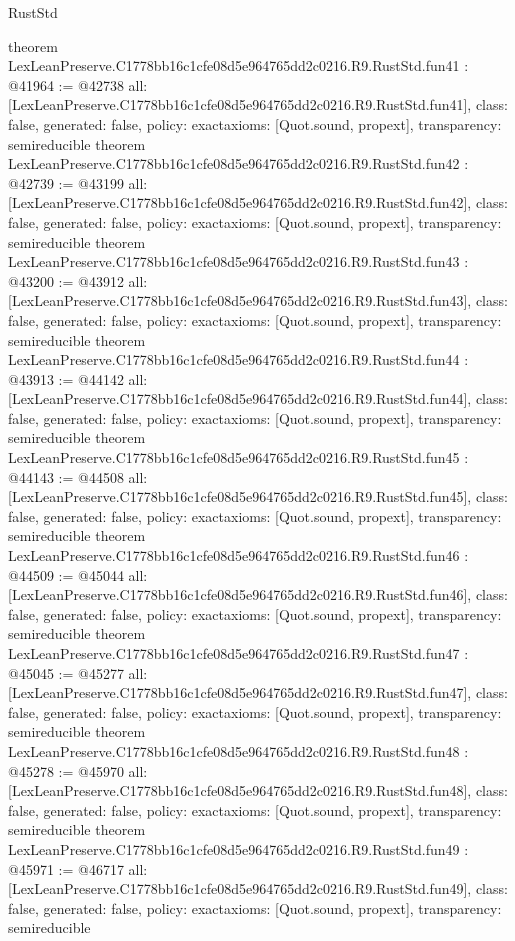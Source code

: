 \begin{lexlean}{RustStd}
\begin{coremodule}
{}
theorem LexLeanPreserve.C1778bb16c1cfe08d5e964765dd2c0216.R9.RustStd.fun41 : @41964 := @42738 {
  all: [LexLeanPreserve.C1778bb16c1cfe08d5e964765dd2c0216.R9.RustStd.fun41],
  class: false,
  generated: false,
  policy: exact{axioms: [Quot.sound, propext]},
  transparency: semireducible
}
theorem LexLeanPreserve.C1778bb16c1cfe08d5e964765dd2c0216.R9.RustStd.fun42 : @42739 := @43199 {
  all: [LexLeanPreserve.C1778bb16c1cfe08d5e964765dd2c0216.R9.RustStd.fun42],
  class: false,
  generated: false,
  policy: exact{axioms: [Quot.sound, propext]},
  transparency: semireducible
}
theorem LexLeanPreserve.C1778bb16c1cfe08d5e964765dd2c0216.R9.RustStd.fun43 : @43200 := @43912 {
  all: [LexLeanPreserve.C1778bb16c1cfe08d5e964765dd2c0216.R9.RustStd.fun43],
  class: false,
  generated: false,
  policy: exact{axioms: [Quot.sound, propext]},
  transparency: semireducible
}
theorem LexLeanPreserve.C1778bb16c1cfe08d5e964765dd2c0216.R9.RustStd.fun44 : @43913 := @44142 {
  all: [LexLeanPreserve.C1778bb16c1cfe08d5e964765dd2c0216.R9.RustStd.fun44],
  class: false,
  generated: false,
  policy: exact{axioms: [Quot.sound, propext]},
  transparency: semireducible
}
theorem LexLeanPreserve.C1778bb16c1cfe08d5e964765dd2c0216.R9.RustStd.fun45 : @44143 := @44508 {
  all: [LexLeanPreserve.C1778bb16c1cfe08d5e964765dd2c0216.R9.RustStd.fun45],
  class: false,
  generated: false,
  policy: exact{axioms: [Quot.sound, propext]},
  transparency: semireducible
}
theorem LexLeanPreserve.C1778bb16c1cfe08d5e964765dd2c0216.R9.RustStd.fun46 : @44509 := @45044 {
  all: [LexLeanPreserve.C1778bb16c1cfe08d5e964765dd2c0216.R9.RustStd.fun46],
  class: false,
  generated: false,
  policy: exact{axioms: [Quot.sound, propext]},
  transparency: semireducible
}
theorem LexLeanPreserve.C1778bb16c1cfe08d5e964765dd2c0216.R9.RustStd.fun47 : @45045 := @45277 {
  all: [LexLeanPreserve.C1778bb16c1cfe08d5e964765dd2c0216.R9.RustStd.fun47],
  class: false,
  generated: false,
  policy: exact{axioms: [Quot.sound, propext]},
  transparency: semireducible
}
theorem LexLeanPreserve.C1778bb16c1cfe08d5e964765dd2c0216.R9.RustStd.fun48 : @45278 := @45970 {
  all: [LexLeanPreserve.C1778bb16c1cfe08d5e964765dd2c0216.R9.RustStd.fun48],
  class: false,
  generated: false,
  policy: exact{axioms: [Quot.sound, propext]},
  transparency: semireducible
}
theorem LexLeanPreserve.C1778bb16c1cfe08d5e964765dd2c0216.R9.RustStd.fun49 : @45971 := @46717 {
  all: [LexLeanPreserve.C1778bb16c1cfe08d5e964765dd2c0216.R9.RustStd.fun49],
  class: false,
  generated: false,
  policy: exact{axioms: [Quot.sound, propext]},
  transparency: semireducible
}
\end{coremodule}
\end{lexlean}
